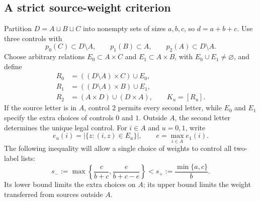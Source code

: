 \documentclass[11pt,reqno]{amsart}
\numberwithin{equation}{section}
\theoremstyle{definition}
\theoremstyle{definition}
\begin{document}
\subsection{A strict source-weight criterion}
Partition $D=A\sqcup B\sqcup C$ into nonempty sets of sizes
$a,b,c$, so $d=a+b+c$. Use three controls with
\begin{equation}\label{eq:weight-land}
 p_0(C)\subset D\setminus A,\qquad p_1(B)\subset A,
 \qquad p_2(A)\subset D\setminus A.
\end{equation}
Choose arbitrary relations $E_0\subset A\times C$ and
$E_1\subset A\times B$, with $E_0\cup E_1\ne\varnothing$,
and define
\begin{align}
 R_0&=((D\setminus A)\times C)\cup E_0,\nonumber\\
 R_1&=((D\setminus A)\times B)\cup E_1,\label{eq:weight-domains}\\
 R_2&=(A\times D)\cup(D\times A),\qquad K_u=[R_u].\nonumber
\end{align}
If the source letter is in $A$, control $2$ permits every second
letter, while $E_0$ and $E_1$ specify the extra choices of controls
$0$ and $1$. Outside $A$, the second letter determines the unique
legal control. For $i\in A$ and $u=0,1$, write
\[
 e_u(i)=|\{z:(i,z)\in E_u\}|,\qquad e=\max_{i\in A}e_1(i).
\]
The following inequality will allow a single choice of weights to
control all two-label lists:
\begin{equation}\label{eq:weight-count}
 s_-:=\max\left\{\frac c{b+c},\frac e{b+c-e}\right\}
 <s_+:=\frac{\min\{a,c\}}b.
\end{equation}
Its lower bound limits the extra choices on $A$; its upper bound
limits the weight transferred from sources outside $A$.
\end{document}
